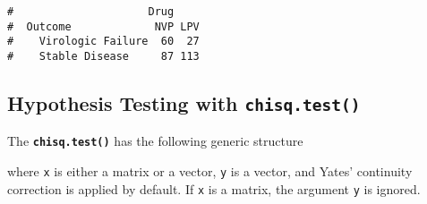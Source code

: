 \documentclass[letterpaper,12pt,twoside,]{pinp}
\begin{document}
\begin{Shaded}
\begin{Highlighting}[]
\StringTok{ }\NormalTok{(}\NormalTok{(}\NormalTok{, }\NormalTok{, }\NormalTok{, }\NormalTok{),}
                    \NormalTok{, } \NormalTok{, }

\StringTok{ }\NormalTok{(}\NormalTok{ =}\StringTok{ }\NormalTok{(}\NormalTok{, }\NormalTok{),}
                           \NormalTok{ =}\StringTok{ }\NormalTok{(}\NormalTok{, }\NormalTok{))}

\end{Highlighting}
\end{Shaded}

\begin{ShadedResult}
\begin{verbatim}
#                     Drug
#  Outcome             NVP LPV
#    Virologic Failure  60  27
#    Stable Disease     87 113
\end{verbatim}
\end{ShadedResult}

\hypertarget{hypothesis-testing-with-2}{%
\subsection{\texorpdfstring{Hypothesis Testing with
\texttt{chisq.test()}}{Hypothesis Testing with }}\label{hypothesis-testing-with-2}}

The \textbf{\texttt{chisq.test()}} has the following generic structure

\begin{Shaded}
\begin{Highlighting}[]
 \NormalTok{)}
\end{Highlighting}
\end{Shaded}

where \texttt{x} is either a matrix or a vector, \texttt{y} is a vector,
and Yates' continuity correction is applied by default. If \texttt{x} is
a matrix, the argument \texttt{y} is ignored.
\end{document}
